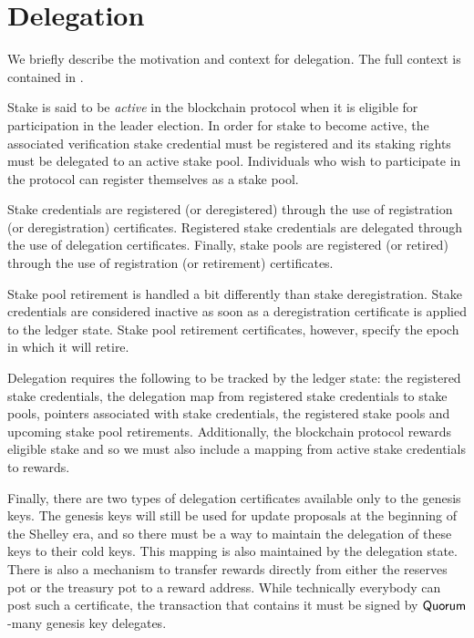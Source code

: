 \section{Delegation}
\label{sec:delegation-shelley}

We briefly describe the motivation and context for delegation.
The full context is contained in \cite{delegation_design}.

Stake is said to be \textit{active} in the blockchain protocol when it is
eligible for participation in the leader election. In order for stake to become
active, the associated verification stake credential must be registered and its
staking rights must be delegated to an active stake pool. Individuals who wish
to participate in the protocol can register themselves as a stake pool.

Stake credentials are registered (or deregistered) through the use of
registration (or deregistration) certificates. Registered stake credentials are
delegated through the use of delegation certificates.  Finally, stake pools are
registered (or retired) through the use of registration (or retirement)
certificates.

Stake pool retirement is handled a bit differently than stake deregistration.
Stake credentials are considered inactive as soon as a deregistration
certificate is applied to the ledger state.  Stake pool retirement certificates,
however, specify the epoch in which it will retire.

Delegation requires the following to be tracked by the ledger state: the
registered stake credentials, the delegation map from registered stake
credentials to stake pools, pointers associated with stake credentials, the
registered stake pools and upcoming stake pool retirements.  Additionally, the
blockchain protocol rewards eligible stake and so we must also include a mapping
from active stake credentials to rewards.

Finally, there are two types of delegation certificates available only to the
genesis keys. The genesis keys will still be used for update proposals at the
beginning of the Shelley era, and so there must be a way to maintain the delegation
of these keys to their cold keys.  This mapping is also maintained by the
delegation state. There is also a mechanism to transfer rewards directly from
either the reserves pot or the treasury pot to a reward address.
While technically everybody can post such a certificate,
the transaction that contains it must be signed by $\mathsf{Quorum}$-many
genesis key delegates.

